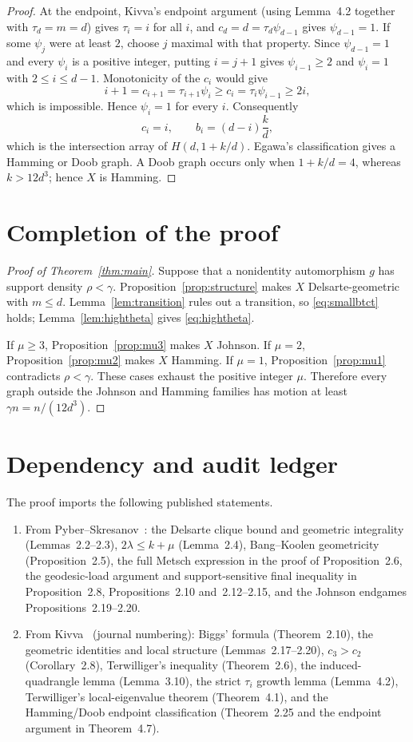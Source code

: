 \documentclass[11pt]{amsart}
\theoremstyle{definition}
\newcommand{\gam}{\gamma}
\begin{document}
\begin{proof}
At the endpoint, Kivva's endpoint argument (using Lemma~4.2 together with $\tau_d=m=d$) gives $\tau_i=i$ for all $i$, and $c_d=d=\tau_d\psi_{d-1}$ gives $\psi_{d-1}=1$.  If some $\psi_j$ were at least $2$, choose $j$ maximal with that property.  Since $\psi_{d-1}=1$ and every $\psi_i$ is a positive integer, putting $i=j+1$ gives $\psi_{i-1}\ge2$ and $\psi_i=1$ with $2\le i\le d-1$.  Monotonicity of the $c_i$ would give
\[
  i+1=c_{i+1}=\tau_{i+1}\psi_i
  \ge c_i=\tau_i\psi_{i-1}\ge2i,
\]
which is impossible.  Hence $\psi_i=1$ for every $i$.  Consequently
\[
  c_i=i,
  \qquad
  b_i=(d-i)\frac{k}{d},
\]
which is the intersection array of $H(d,1+k/d)$.  Egawa's classification gives a Hamming or Doob graph.  A Doob graph occurs only when $1+k/d=4$, whereas $k>12d^3$; hence $X$ is Hamming.
\end{proof}

\section{Completion of the proof}
\begin{proof}[Proof of Theorem~\ref{thm:main}]
Suppose that a nonidentity automorphism $g$ has support density $\rho<\gam$.  Proposition~\ref{prop:structure} makes $X$ Delsarte-geometric with $m\le d$.  Lemma~\ref{lem:transition} rules out a transition, so \eqref{eq:smallbtct} holds; Lemma~\ref{lem:hightheta} gives \eqref{eq:hightheta}.

If $\mu\ge3$, Proposition~\ref{prop:mu3} makes $X$ Johnson.  If $\mu=2$, Proposition~\ref{prop:mu2} makes $X$ Hamming.  If $\mu=1$, Proposition~\ref{prop:mu1} contradicts $\rho<\gam$.  These cases exhaust the positive integer $\mu$.  Therefore every graph outside the Johnson and Hamming families has motion at least $\gam n=n/(12d^3)$.
\end{proof}

\section{Dependency and audit ledger}
The proof imports the following published statements.
\begin{enumerate}[leftmargin=2.2em,itemsep=0.3em]
\item From Pyber--Skresanov~\cite{PS}: the Delsarte clique bound and geometric integrality (Lemmas~2.2--2.3), $2\lambda\le k+\mu$ (Lemma~2.4), Bang--Koolen geometricity (Proposition~2.5), the full Metsch expression in the proof of Proposition~2.6, the geodesic-load argument and support-sensitive final inequality in Proposition~2.8, Propositions~2.10 and~2.12--2.15, and the Johnson endgames Propositions~2.19--2.20.
\item From Kivva~\cite{Kivva} (journal numbering): Biggs' formula (Theorem~2.10), the geometric identities and local structure (Lemmas~2.17--2.20), $c_3>c_2$ (Corollary~2.8), Terwilliger's inequality (Theorem~2.6), the induced-quadrangle lemma (Lemma~3.10), the strict $\tau_i$ growth lemma (Lemma~4.2), Terwilliger's local-eigenvalue theorem (Theorem~4.1), and the Hamming/Doob endpoint classification (Theorem~2.25 and the endpoint argument in Theorem~4.7).
\end{enumerate}
\end{document}
